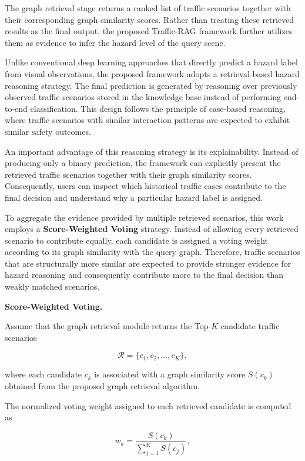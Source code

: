 \documentclass[a4paper, 11pt]{article} %
\begin{document}
The graph retrieval stage returns a ranked list of traffic scenarios together with their corresponding graph similarity scores. Rather than treating these retrieved results as the final output, the proposed Traffic-RAG framework further utilizes them as evidence to infer the hazard level of the query scene.

Unlike conventional deep learning approaches that directly predict a hazard label from visual observations, the proposed framework adopts a retrieval-based hazard reasoning strategy. The final prediction is generated by reasoning over previously observed traffic scenarios stored in the knowledge base instead of performing end-to-end classification. This design follows the principle of case-based reasoning, where traffic scenarios with similar interaction patterns are expected to exhibit similar safety outcomes.

An important advantage of this reasoning strategy is its explainability. Instead of producing only a binary prediction, the framework can explicitly present the retrieved traffic scenarios together with their graph similarity scores. Consequently, users can inspect which historical traffic cases contribute to the final decision and understand why a particular hazard label is assigned.

To aggregate the evidence provided by multiple retrieved scenarios, this work employs a \textbf{Score-Weighted Voting} strategy. Instead of allowing every retrieved scenario to contribute equally, each candidate is assigned a voting weight according to its graph similarity with the query graph. Therefore, traffic scenarios that are structurally more similar are expected to provide stronger evidence for hazard reasoning and consequently contribute more to the final decision than weakly matched scenarios.

\textbf{Score-Weighted Voting.}

Assume that the graph retrieval module returns the Top-$K$ candidate traffic scenarios

\[
\mathcal{R}
=
\{c_1,c_2,\ldots,c_K\},
\]

where each candidate $c_k$ is associated with a graph similarity score $S(c_k)$ obtained from the proposed graph retrieval algorithm.

The normalized voting weight assigned to each retrieved candidate is computed as

\begin{equation}
w_k
=
\frac{S(c_k)}
{\sum_{j=1}^{K}S(c_j)},
\label{eq:voting_weight}
\end{equation}
\end{document}
